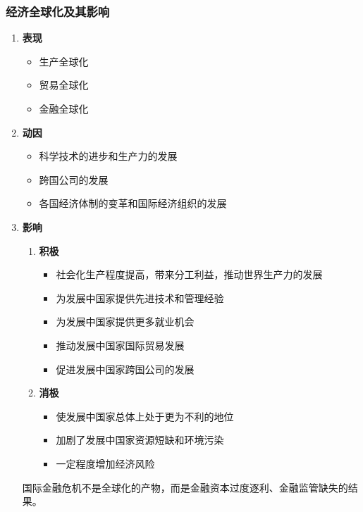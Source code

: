 \documentclass[12pt, a4paper, oneside]{ctexart}
\begin{document}
\subsubsection{经济全球化及其影响}

\begin{enumerate}
  \item {\bf 表现}
  
  \begin{itemize}
    \item 生产全球化
    \item 贸易全球化
    \item 金融全球化
  \end{itemize}

  \item {\bf 动因}
  
  \begin{itemize}
    \item 科学技术的进步和生产力的发展
    \item 跨国公司的发展
    \item 各国经济体制的变革和国际经济组织的发展
  \end{itemize}

  \item {\bf 影响}
  
  \begin{enumerate}
    \item {\bf 积极}
    
    \begin{itemize}
      \item 社会化生产程度提高，带来分工利益，推动世界生产力的发展
      \item 为发展中国家提供先进技术和管理经验
      \item 为发展中国家提供更多就业机会
      \item 推动发展中国家国际贸易发展
      \item 促进发展中国家跨国公司的发展
    \end{itemize}
    
    \item {\bf 消极}
    
    \begin{itemize}
      \item 使发展中国家总体上处于更为不利的地位
      \item 加剧了发展中国家资源短缺和环境污染
      \item 一定程度增加经济风险
    \end{itemize}

  \end{enumerate}

  国际金融危机不是全球化的产物，而是金融资本过度逐利、金融监管缺失的结果。

\end{enumerate}
\end{document}
